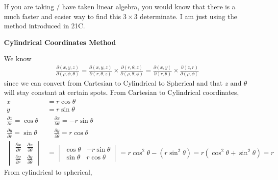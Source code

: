 \documentclass{article}
\begin{document}
If you are taking / have taken linear algebra, you would know that there is a much faster and easier way to find this $3\times3$ determinate. I am just using the method introduced in 21C.

{}\textbf{Cylindrical Coordinates Method}

We know
\begin{align*}
 \frac{\partial (x,y,z)}{\partial (\rho,\phi,\theta)}=\frac{\partial (x,y,z)}{\partial (r,\theta,z)}\times \frac{\partial (r,\theta,z)}{\partial (\rho,\theta,\phi)}=\frac{\partial (x,y)}{\partial (r,\theta)}\times\frac{\partial (z, r)}{\partial(\rho,\phi)}
\end{align*}
since we can convert from Cartesian to Cylindrical to Spherical and that $z$ and $\theta$ will stay constant at certain spots.
From Cartesian to Cylindrical coordinates,
\begin{align*}
    x&=r\cos\theta\\
    y&=r\sin\theta\\
    \frac{\partial x}{\partial r} = \cos\theta &\hspace{1em}\frac{\partial x}{\partial \theta}=-r\sin\theta\\
     \frac{\partial y}{\partial r} = \sin\theta &\hspace{1em}\frac{\partial y}{\partial \theta}=r\cos\theta\\
    \begin{vmatrix}
      \frac{\partial x}{\partial r} & \frac{\partial x}{\partial \theta}\\
      \frac{\partial y}{\partial r} &
      \frac{\partial y}{\partial \theta}
    \end{vmatrix}&=\begin{vmatrix}
      \cos\theta & -r\sin\theta\\
      \sin\theta & r\cos\theta
    \end{vmatrix}=r\cos^2\theta -(r\sin^2\theta)=r(\cos^2\theta+\sin^2\theta) = r
\end{align*}
From cylindrical to spherical,
\end{document}
